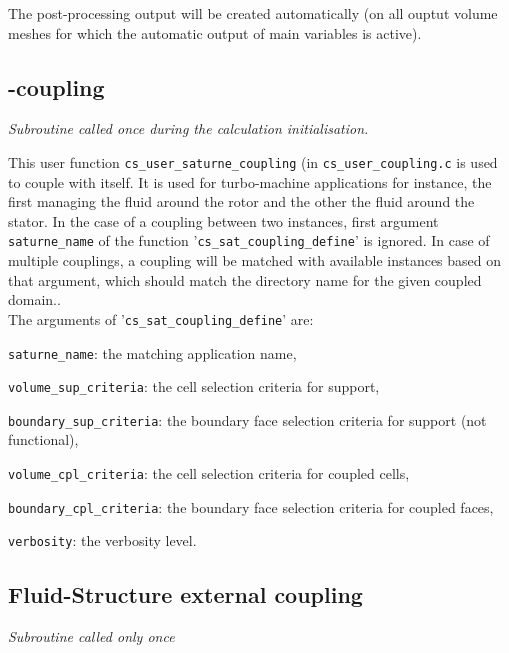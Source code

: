 {{The post-processing output will be created automatically (on all ouptut volume
meshes for which the automatic output of main variables is active).

\subsection{\CS-\CS coupling}

\noindent
\textit{Subroutine called once during the calculation initialisation.}

This user function \texttt{cs\_user\_saturne\_coupling} (in
 \texttt{cs\_user\_coupling.c} is used to couple \CS with itself.
 It is used for turbo-machine applications for instance, the first \CS managing
 the fluid around the rotor and the other the fluid around the stator.
In the case of a coupling between two \CS instances, first argument \texttt{saturne\_name}
 of the function '\texttt{cs\_sat\_coupling\_define}' is ignored.
 In case of multiple couplings, a coupling will be matched with available \CS
 instances based on that argument, which should match the directory name for the
 given coupled domain..\\
The arguments of '\texttt{cs\_sat\_coupling\_define}' are:
\begin{list}{-}{}
\item \texttt{saturne\_name}: the matching \CS application name,
\item \texttt{volume\_sup\_criteria}: the cell selection criteria for support,
\item \texttt{boundary\_sup\_criteria}: the boundary face selection criteria for support (not functional),
\item \texttt{volume\_cpl\_criteria}: the cell selection criteria for coupled cells,
\item \texttt{boundary\_cpl\_criteria}: the boundary face selection criteria for coupled faces,
\item \texttt{verbosity}: the verbosity level.
\end{list}


\subsection{Fluid-Structure external coupling}

\noindent
\textit{Subroutine called only once}

}}

